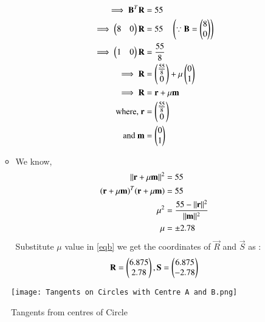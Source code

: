 \documentclass[journal,12pt,twocolumn]{IEEEtran}
\begin{document}
\begin{enumerate}
\begin{itemize}
  \begin{align}
  \implies \mathbf{B}^T \mathbf{R} &= 55 
  \\
  \implies \begin{pmatrix}8&0\end{pmatrix} \mathbf{R} &= 55 \quad \left(\because \mathbf{B} = \begin{pmatrix}8\\0\end{pmatrix} \right)
  \\
   \implies\begin{pmatrix}1&0\end{pmatrix} \mathbf{R} &= \frac{55}{8}
   \\
   \implies\mathbf{R} &= \begin{pmatrix}\frac{55}{8}\\0\end{pmatrix} + \mu \begin{pmatrix}0\\1\end{pmatrix} 
    \\
    \implies \mathbf{R}&=\mathbf{r}+\mu\mathbf{m} \label{eqb}
   \\
   \text{where, }\mathbf{r}&=\begin{pmatrix}\frac{55}{8}\\0\end{pmatrix}
   \\
   \text{and }\mathbf{m}&=\begin{pmatrix}0\\1\end{pmatrix}
\end{align}
\item We know,
\begin{align}
\lVert\mathbf{r}+\mu\mathbf{m}\rVert^2&=55
\\
(\mathbf{r}+\mu \mathbf{m})^T(\mathbf{r}+\mu \mathbf{m})&=55
\\
\mu^2&=\frac{55-\lVert\mathbf{r}\rVert^2}{\lVert\mathbf{m}\rVert^2}
\\
\mu &= \pm 2.78
\end{align}
Substitute $\mu$  value in \eqref{eqb} we get the coordinates of $\vec{R}$ and  $\vec{S}$ as :
\begin{align}
\mathbf{R}=\begin{pmatrix}6.875\\2.78\end{pmatrix},
\mathbf{S}=\begin{pmatrix}6.875\\-2.78\end{pmatrix}
\end{align}
\end{itemize}
\end{enumerate}

\begin{figure}[H]
\centering
\texttt{[image: Tangents on Circles with Centre A and B.png]}
\caption{Tangents from centres of Circle}
\label{fig:circle}	
\end{figure}
\end{document}

